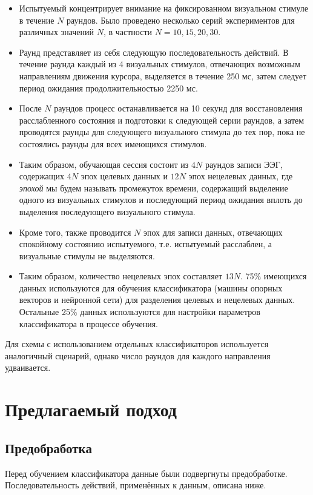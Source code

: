 \documentclass[12pt,a4paper,oneside,fleqn,leqno]{article}
\begin{document}
	\begin{itemize} 
	\item
	Испытуемый концентрирует внимание на фиксированном визуальном стимуле в течение $N$ раундов. Было проведено несколько серий экспериментов для различных значений $N$, в частности $N = 10, 15, 20, 30.$
	\item
	Раунд представляет из себя следующую последовательность действий. В течение раунда каждый из 4 визуальных стимулов, отвечающих возможным направлениям движения курсора, выделяется в течение 250 мс, затем следует период ожидания продолжительностью 2250 мс. 
	\item
	После $N$ раундов процесс останавливается на 10 секунд для восстановления расслабленного состояния и подготовки к следующей серии раундов, а затем проводятся раунды для следующего визуального стимула до тех пор, пока не состоялись раунды для всех имеющихся стимулов.
	\item
	Таким образом, обучающая сессия состоит из $4N$ раундов записи ЭЭГ, содержащих $4N$ эпох целевых данных и $12N$ эпох нецелевых данных, где {\it эпохой} мы будем называть промежуток времени, содержащий выделение одного из визуальных стимулов и последующий период ожидания вплоть до выделения последующего визуального стимула.
	\item
	Кроме того, также проводится $N$ эпох для записи данных, отвечающих спокойному состоянию испытуемого, т.е. испытуемый расслаблен, а визуальные стимулы не выделяются.
	\item
	Таким образом, количество нецелевых эпох составляет $13N$. 75\% имеющихся данных используются для обучения классификатора (машины опорных векторов и нейронной сети) для разделения целевых и нецелевых данных. Остальные 25\% данных используются для настройки параметров классификатора в процессе обучения.
	\end{itemize}
	\par Для схемы с использованием отдельных классификаторов используется аналогичный сценарий, однако число раундов для каждого направления удваивается.

\newpage
\section{Предлагаемый подход}
\subsection{Предобработка}
	\par Перед обучением классификатора данные были подвергнуты предобработке. Последовательность действий, применённых к данным, описана ниже. 
\end{document}
